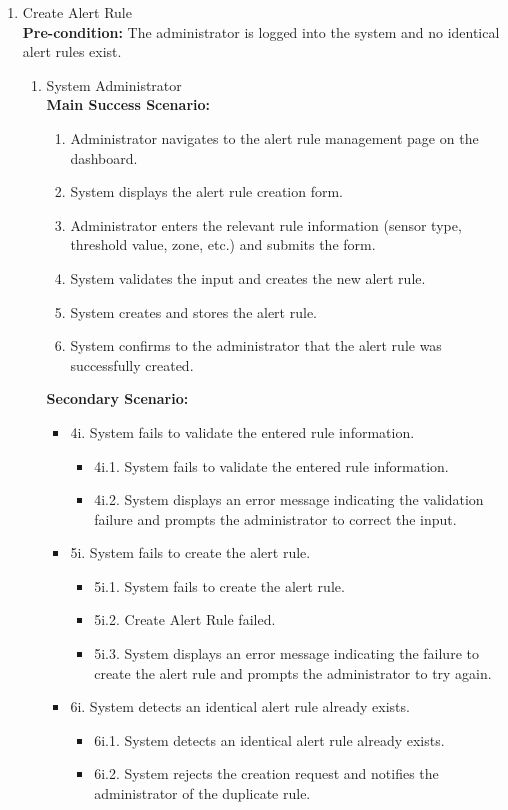 {\begin{enumerate}[{\bf BE1.}]
	\item Create Alert Rule \\
	{\bf Pre-condition:} The administrator is logged into the system and no identical alert rules exist.
	\begin{enumerate}[{\bf VP1.}]
		\item System Administrator \\
			{\bf Main Success Scenario:}
				\begin{enumerate}[1. ]
					\item Administrator navigates to the alert rule management page on the dashboard.
					\item System displays the alert rule creation form.
					\item Administrator enters the relevant rule information (sensor type, threshold value, zone, etc.) and submits the form.
					\item System validates the input and creates the new alert rule.
					\item System creates and stores the alert rule.
					\item System confirms to the administrator that the alert rule was successfully created.
				\end{enumerate}

			{\bf Secondary Scenario:}
			\begin{itemize}
				\item[] {4i.} System fails to validate the entered rule information.
				\begin{itemize}
					\item[] {4i.1.} System fails to validate the entered rule information.
					\item[] {4i.2.} System displays an error message indicating the validation failure and prompts the administrator to correct the input.
				\end{itemize}
				\item[] {5i.} System fails to create the alert rule.
				\begin{itemize}
					\item[] {5i.1.} System fails to create the alert rule.
					\item[] {5i.2.} Create Alert Rule failed.
					\item[] {5i.3.} System displays an error message indicating the failure to create the alert rule and prompts the administrator to try again.
				\end{itemize}
				\item[] {6i.} System detects an identical alert rule already exists.
				\begin{itemize}
					\item[] {6i.1.} System detects an identical alert rule already exists.
					\item[] {6i.2.} System rejects the creation request and notifies the administrator of the duplicate rule.
				\end{itemize}
			\end{itemize}


\end{enumerate}
\end{enumerate}}
